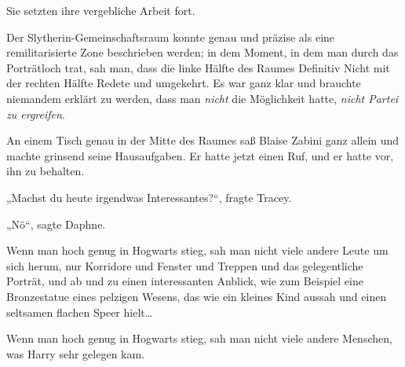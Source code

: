 Sie setzten ihre vergebliche Arbeit fort.


Der Slytherin-Gemeinschaftsraum konnte genau und präzise als eine remilitarisierte Zone beschrieben werden; in dem Moment, in dem man durch das Porträtloch trat, sah man, dass die linke Hälfte des Raumes Definitiv Nicht mit der rechten Hälfte Redete und umgekehrt. Es war ganz klar und brauchte niemandem erklärt zu werden, dass man \emph{nicht} die Möglichkeit hatte, \emph{nicht Partei zu ergreifen}.

An einem Tisch genau in der Mitte des Raumes saß Blaise Zabini ganz allein und machte grinsend seine Hausaufgaben. Er hatte jetzt einen Ruf, und er hatte vor, ihn zu behalten.


„Machst du heute irgendwas Interessantes?“, fragte Tracey.

„Nö“, sagte Daphne.


Wenn man hoch genug in Hogwarts stieg, sah man nicht viele andere Leute um sich herum, nur Korridore und Fenster und Treppen und das gelegentliche Porträt, und ab und zu einen interessanten Anblick, wie zum Beispiel eine Bronzestatue eines pelzigen Wesens, das wie ein kleines Kind aussah und einen seltsamen flachen Speer hielt…

Wenn man hoch genug in Hogwarts stieg, sah man nicht viele andere Menschen, was Harry sehr gelegen kam.

